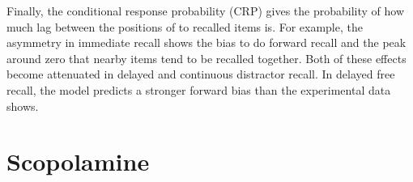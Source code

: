 Finally, the conditional response probability (CRP) gives the probability of how much lag between the positions of to recalled items is.
For example, the asymmetry in immediate recall shows the bias to do forward recall and the peak around zero that nearby items tend to be recalled together.
Both of these effects become attenuated in delayed and continuous distractor recall.
In delayed free recall, the model predicts a stronger forward bias than the experimental data shows.


\section{Scopolamine}
